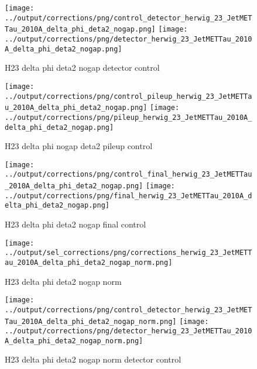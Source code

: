 \documentclass[11pt]{book}
\begin{document}
\begin{figure}[ht]
\centering
\texttt{[image: ../output/corrections/png/control\_detector\_herwig\_23\_JetMETTau\_2010A\_delta\_phi\_deta2\_nogap.png]}
\texttt{[image: ../output/corrections/png/detector\_herwig\_23\_JetMETTau\_2010A\_delta\_phi\_deta2\_nogap.png]}
\caption{H23 delta phi deta2 nogap detector control}
\label{fig:H23_JetMETTau_2010A_delta_phi_deta2_nogap_detector_control}
\end{figure}

\begin{figure}[ht]
\centering
\texttt{[image: ../output/corrections/png/control\_pileup\_herwig\_23\_JetMETTau\_2010A\_delta\_phi\_deta2\_nogap.png]}
\texttt{[image: ../output/corrections/png/pileup\_herwig\_23\_JetMETTau\_2010A\_delta\_phi\_deta2\_nogap.png]}
\caption{H23 delta phi nogap deta2 pileup control}
\label{fig:H23_JetMETTau_2010A_delta_phi_deta2_nogap_pileup_control}
\end{figure}


\begin{figure}[ht]
\centering
\texttt{[image: ../output/corrections/png/control\_final\_herwig\_23\_JetMETTau\_2010A\_delta\_phi\_deta2\_nogap.png]}
\texttt{[image: ../output/corrections/png/final\_herwig\_23\_JetMETTau\_2010A\_delta\_phi\_deta2\_nogap.png]}
\caption{H23 delta phi deta2 nogap final control}
\label{fig:H23_JetMETTau_2010A_delta_phi_deta2_nogap_final_control}
\end{figure}

\begin{figure}[ht]
\centering
\texttt{[image: ../output/sel\_corrections/png/corrections\_herwig\_23\_JetMETTau\_2010A\_delta\_phi\_deta2\_nogap\_norm.png]}
\caption{H23 delta phi deta2 nogap norm}
\label{fig:H23_JetMETTau_2010A_delta_phi_deta2_nogap_norm}
\end{figure}

\begin{figure}[ht]
\centering
\texttt{[image: ../output/corrections/png/control\_detector\_herwig\_23\_JetMETTau\_2010A\_delta\_phi\_deta2\_nogap\_norm.png]}
\texttt{[image: ../output/corrections/png/detector\_herwig\_23\_JetMETTau\_2010A\_delta\_phi\_deta2\_nogap\_norm.png]}
\caption{H23 delta phi deta2 nogap norm detector control}
\label{fig:H23_JetMETTau_2010A_delta_phi_deta2_nogap_norm_detector_control}
\end{figure}
\end{document}
